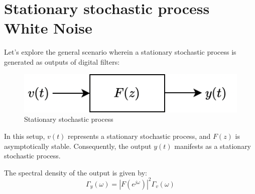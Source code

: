 \section{Stationary stochastic process White Noise}

Let's explore the general scenario wherein a stationary stochastic process is generated as outputs of digital filters:
\begin{figure}[H]
    \centering
    \includegraphics[width=0.45\linewidth]{images/ssp.png}
    \caption{Stationary stochastic process}
\end{figure}
In this setup, $v(t)$ represents a stationary stochastic process, and $F(z)$ is asymptotically stable. 
Consequently, the output $y(t)$ manifests as a stationary stochastic process.
\begin{theorem}
    The spectral density of the output is given by:
    \[\Gamma_y(\omega)=\left\lvert F(e^{j\omega})\right\rvert^2 \Gamma_v(\omega) \]
\end{theorem}


